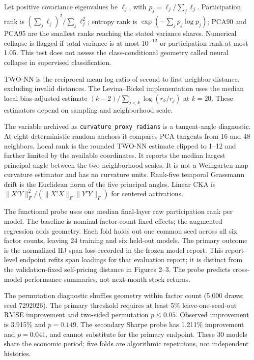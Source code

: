 \documentclass[11pt]{article}
\begin{document}
Let positive covariance eigenvalues be $\ell_j$, with $p_j=\ell_j/\sum_j\ell_j$. Participation rank is $(\sum_j\ell_j)^2/\sum_j\ell_j^2$; entropy rank is $\exp(-\sum_jp_j\log p_j)$; PCA90 and PCA95 are the smallest ranks reaching the stated variance shares. Numerical collapse is flagged if total variance is at most $10^{-12}$ or participation rank at most 1.05. This test does not assess the class-conditional geometry called neural collapse in supervised classification.

TWO-NN is the reciprocal mean log ratio of second to first neighbor distance, excluding invalid distances. The Levina--Bickel implementation uses the median local bias-adjusted estimate $(k-2)/\sum_{j<k}\log(r_k/r_j)$ at $k=20$. These estimators depend on sampling and neighborhood scale.

The variable archived as \texttt{curvature\_proxy\_radians} is a tangent-angle diagnostic. At eight deterministic random anchors it compares PCA tangents from 16 and 48 neighbors. Local rank is the rounded TWO-NN estimate clipped to 1--12 and further limited by the available coordinates. It reports the median largest principal angle between the two neighborhood scales. It is not a Weingarten-map curvature estimator and has no curvature units. Rank-five temporal Grassmann drift is the Euclidean norm of the five principal angles. Linear CKA is $\|X'Y\|_F^2/(\|X'X\|_F\|Y'Y\|_F)$ for centered activations.

The functional probe uses one median final-layer raw participation rank per model. The baseline is nominal-factor-count fixed effects; the augmented regression adds geometry. Each fold holds out one common seed across all six factor counts, leaving 24 training and six held-out models. The primary outcome is the normalized HJ span loss recorded in the frozen model report. This report-level endpoint refits span loadings for that evaluation report; it is distinct from the validation-fixed self-pricing distance in Figures 2--3. The probe predicts cross-model performance summaries, not next-month stock returns.

The permutation diagnostic shuffles geometry within factor count (5,000 draws; seed 7292026). The primary threshold requires at least 5\% leave-one-seed-out RMSE improvement and two-sided permutation $p\le0.05$. Observed improvement is 3.915\% and $p=0.149$. The secondary Sharpe probe has 1.211\% improvement and $p=0.041$, and cannot substitute for the primary endpoint. These 30 models share the economic period; five folds are algorithmic repetitions, not independent histories.
\end{document}
